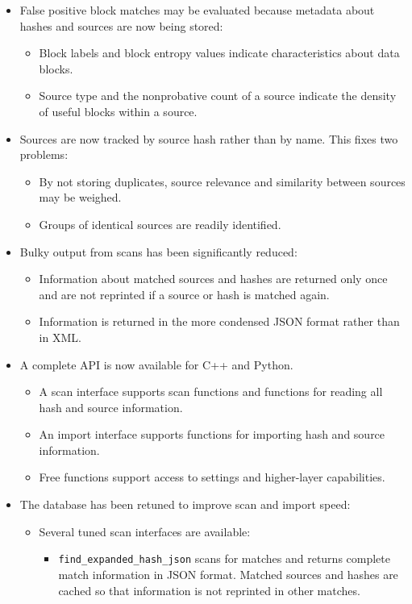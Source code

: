 \documentclass[11pt,fleqn]{article} %
\begin{document}
\begin{itemize}
\item False positive block matches may be evaluated because metadata about hashes and sources are now being stored:
  \begin{itemize}
  \item Block labels and block entropy values indicate characteristics about data blocks.
  \item Source type and the nonprobative count of a source indicate the density of useful blocks within a source.
\end{itemize}
\item Sources are now tracked by source hash rather than by name.  This fixes two problems:
  \begin{itemize}
  \item By not storing duplicates, source relevance and similarity between sources may be weighed.
  \item Groups of identical sources are readily identified.
  \end{itemize}
\item Bulky output from scans has been significantly reduced:
  \begin{itemize}
  \item Information about matched sources and hashes are returned only once and are not reprinted if a source or hash is matched again.
  \item Information is returned in the more condensed JSON format rather than in XML.
  \end{itemize}
\item A complete \hdb API is now available for C++ and Python.
  \begin{itemize}
  \item A scan interface supports scan functions and functions for reading all hash and source information.
  \item An import interface supports functions for importing hash and source information.
  \item Free functions support access to settings and higher-layer capabilities.
  \end{itemize}
\item The database has been retuned to improve scan and import speed:
  \begin{itemize}
  \item Several tuned scan interfaces are available:
    \begin{itemize}
    \item \verb+find_expanded_hash_json+ scans for matches and returns complete match information in JSON format.  Matched sources and hashes are cached so that information is not reprinted in other matches.

\end{itemize}
\end{itemize}
\end{itemize}
\end{document}
